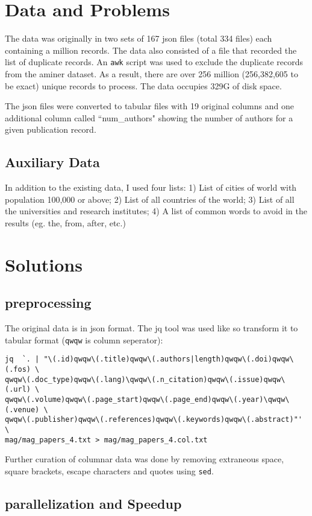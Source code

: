 \documentclass{report}
\begin{document}
\section*{Data and Problems}
The data was originally in two sets of 167 json files (total 334 files) each
containing a million records. The data also consisted of a file that recorded
the list of duplicate records. An \texttt{awk} script was used to exclude the
duplicate records from the aminer dataset. As a result, there are over 256
million (256,382,605 to be exact) unique records to process. The data occupies
329G of disk space.

The json files were converted to tabular files with 19 original columns and one
additional column called ``num\_authors" showing the number of authors for a given
publication record.

\subsection*{Auxiliary Data}
In addition to the existing data, I used four lists: 1) List of cities of
world with population 100,000 or above; 2) List of all countries of the world;
3) List of all the universities and research institutes; 4) A list of common
words to avoid in the results (eg. the, from, after, etc.)

\section*{Solutions}
\subsection*{preprocessing}
The original data is in json format. The jq tool was used like so transform it to tabular format (\texttt{qwqw} is column seperator):
\begin{verbatim}
jq  `. | "\(.id)qwqw\(.title)qwqw\(.authors|length)qwqw\(.doi)qwqw\(.fos) \
qwqw\(.doc_type)qwqw\(.lang)\qwqw\(.n_citation)qwqw\(.issue)qwqw\(.url) \
qwqw\(.volume)qwqw\(.page_start)qwqw\(.page_end)qwqw\(.year)\qwqw\(.venue) \
qwqw\(.publisher)qwqw\(.references)qwqw\(.keywords)qwqw\(.abstract)"' \
mag/mag_papers_4.txt > mag/mag_papers_4.col.txt
\end{verbatim}
Further curation of columnar data was done by removing extraneous space, square brackets, escape characters and quotes using \texttt{sed}.

\subsection*{parallelization and Speedup}
\end{document}
